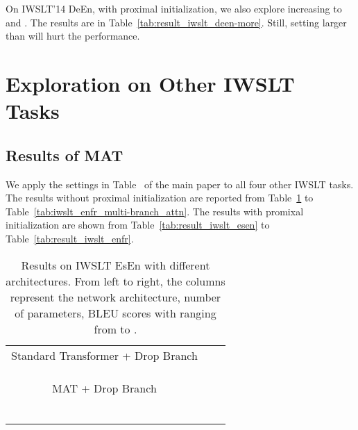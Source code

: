 \documentclass{article}
\begin{document}
On IWSLT'14 DeEn, with proximal initialization, we also explore increasing  to  and . The results are in Table~\ref{tab:result_iwslt_deen-more}. Still, setting  larger than  will hurt the performance.

\section{Exploration on Other IWSLT Tasks}

\subsection{Results of MAT}

We apply the settings in Table~ of the main paper to all four other IWSLT tasks. The results without proximal initialization are reported from Table~\ref{tab:iwslt_esen_multi-branch_attn} to Table~\ref{tab:iwslt_enfr_multi-branch_attn}. The results with promixal initialization are shown from Table~\ref{tab:result_iwslt_esen} to Table~\ref{tab:result_iwslt_enfr}. 


\begin{table}[!htbp]
\centering
\small
\caption{Results on IWSLT EsEn with different architectures. From left to right, the columns represent the network architecture, number of parameters, BLEU scores with  ranging from  to .}
\begin{tabular}{lcccccc}
\toprule
 &   &  &  &   \\
\midrule
\multicolumn{5}{c}{Standard Transformer + Drop Branch} \\ 
\midrule    
 &     &  &     &    \\
 &	 &	 &	 &	  \\
 &	 &	 &    &	  \\
\midrule
\multicolumn{5}{c}{MAT + Drop Branch} \\
\midrule
 &     &  &  &  \\
 &     &  &  &   \\
 &     &  &  &   \\
 &     &  &  &  \\
 & 	 &  &  &  \\
 & 	 &  &  &  \\
\bottomrule
\end{tabular}
\label{tab:iwslt_esen_multi-branch_attn}
\end{table}
\end{document}
